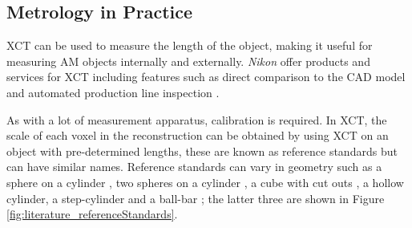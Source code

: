 \subsection{Metrology in Practice}

XCT can be used to measure the length of the object, making it useful for measuring AM objects internally and externally. \emph{Nikon} offer products and services for XCT including features such as direct comparison to the CAD model \citep{nikon2015microfocus, nikon2018mct225} and automated production line inspection \citep{nikon2015inline, nikon2018automated}.

As with a lot of measurement apparatus, calibration is required. In XCT, the scale of each voxel in the reconstruction can be obtained by using XCT on an object with pre-determined lengths, these are known as reference standards \citep{bartscher2007enhancement} but can have similar names. Reference standards can vary in geometry such as a sphere on a cylinder \citep{lifton2013application}, two spheres on a cylinder \citep{sun2016reference}, a cube with cut outs \citep{kiekens2011test}, a hollow cylinder, a step-cylinder and a ball-bar \citep{bartscher2007enhancement}; the latter three are shown in Figure \ref{fig:literature_referenceStandards}.

